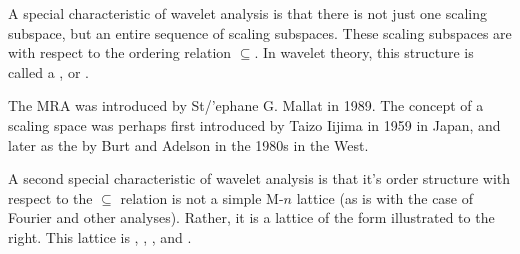     \begin{minipage}{\tw-55mm}%
      A special characteristic of wavelet analysis is that there is not just one
      scaling subspace,
      but an entire sequence of scaling subspaces.
      These scaling subspaces are  with respect to the
      ordering relation $\subseteq$. In wavelet theory, this structure is called a ,
      or  .

     The MRA was introduced by St{/'e}phane G. Mallat in 1989.
     The concept of a scaling space was perhaps first introduced by Taizo Iijima in 1959 in Japan,
    and later as the  by Burt and Adelson in the 1980s in the West.\footnotemark
    \end{minipage}%
    \hfill%
    {\begin{minipage}{50mm}%
      \fns%
    \end{minipage}}%

    \begin{minipage}{\tw-65mm}%
      A second special characteristic of wavelet analysis is that it's order structure
      with respect to the $\subseteq$ relation is not a simple M-$n$ lattice 
     (as is with the case of Fourier and other analyses).
      Rather, it is a lattice of the form illustrated to the right.
      This lattice is , ,
      , and  .
    \end{minipage}%
    \hfill%
    {\begin{minipage}{60mm}%
    \end{minipage}}%

